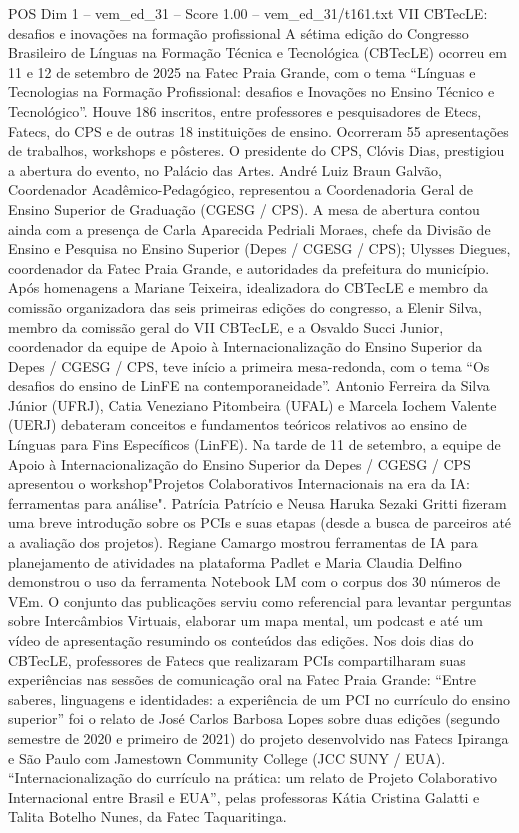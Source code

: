 \begin{textsample}{POS Dim 1 – vem\_ed\_31 – Score 1.00 – vem\_ed\_31/t161.txt}  \label{ex:f1_pos_012}
VII CBTecLE: desafios e inovações na formação profissional A sétima edição do Congresso Brasileiro de Línguas na Formação Técnica e Tecnológica (CBTecLE) ocorreu em 11 e 12 de setembro de 2025 na Fatec Praia Grande, com o tema “Línguas e Tecnologias na Formação Profissional: desafios e Inovações no Ensino Técnico e Tecnológico”.
Houve 186 inscritos, entre professores e pesquisadores de Etecs, Fatecs, do CPS e de outras 18 instituições de ensino.
Ocorreram 55 apresentações de trabalhos, workshops e pôsteres.
O presidente do CPS, Clóvis Dias, prestigiou a abertura do evento, no Palácio das Artes.
André Luiz Braun Galvão, Coordenador Acadêmico-Pedagógico, representou a Coordenadoria Geral de Ensino Superior de Graduação (CGESG / CPS).
A mesa de abertura contou ainda com a presença de Carla Aparecida Pedriali Moraes, chefe da Divisão de Ensino e Pesquisa no Ensino Superior (Depes / CGESG / CPS); Ulysses Diegues, coordenador da Fatec Praia Grande, e autoridades da prefeitura do município.
Após homenagens a Mariane Teixeira, idealizadora do CBTecLE e membro da comissão organizadora das seis primeiras edições do congresso, a Elenir Silva, membro da comissão geral do VII CBTecLE, e a Osvaldo Succi Junior, coordenador da equipe de Apoio à Internacionalização do Ensino Superior da Depes / CGESG / CPS, teve início a primeira mesa-redonda, com o tema “Os desafios do ensino de LinFE na contemporaneidade”.
Antonio Ferreira da Silva Júnior (UFRJ), Catia Veneziano Pitombeira (UFAL) e Marcela Iochem Valente (UERJ) debateram conceitos e fundamentos teóricos relativos ao ensino de Línguas para Fins Específicos (LinFE).
Na tarde de 11 de setembro, a equipe de Apoio à Internacionalização do Ensino Superior da Depes / CGESG / CPS apresentou o workshop"Projetos Colaborativos Internacionais na era da IA: ferramentas para análise".
Patrícia Patrício e Neusa Haruka Sezaki Gritti fizeram uma breve introdução sobre os PCIs e suas etapas (desde a busca de parceiros até a avaliação dos projetos).
Regiane Camargo mostrou ferramentas de IA para planejamento de atividades na plataforma Padlet e Maria Claudia Delfino demonstrou o uso da ferramenta Notebook LM com o corpus dos 30 números de VEm.
O conjunto das publicações serviu como referencial para levantar perguntas sobre Intercâmbios Virtuais, elaborar um mapa mental, um podcast e até um vídeo de apresentação resumindo os conteúdos das edições.
Nos dois dias do CBTecLE, professores de Fatecs que realizaram PCIs compartilharam suas experiências nas sessões de comunicação oral na Fatec Praia Grande: “Entre saberes, linguagens e identidades: a experiência de um PCI no currículo do ensino superior” foi o relato de José Carlos Barbosa Lopes sobre duas edições (segundo semestre de 2020 e primeiro de 2021) do projeto desenvolvido nas Fatecs Ipiranga e São Paulo com Jamestown Community College (JCC SUNY / EUA). “Internacionalização do currículo na prática: um relato de Projeto Colaborativo Internacional entre Brasil e EUA”, pelas professoras Kátia Cristina Galatti e Talita Botelho Nunes, da Fatec Taquaritinga.

\end{textsample}

